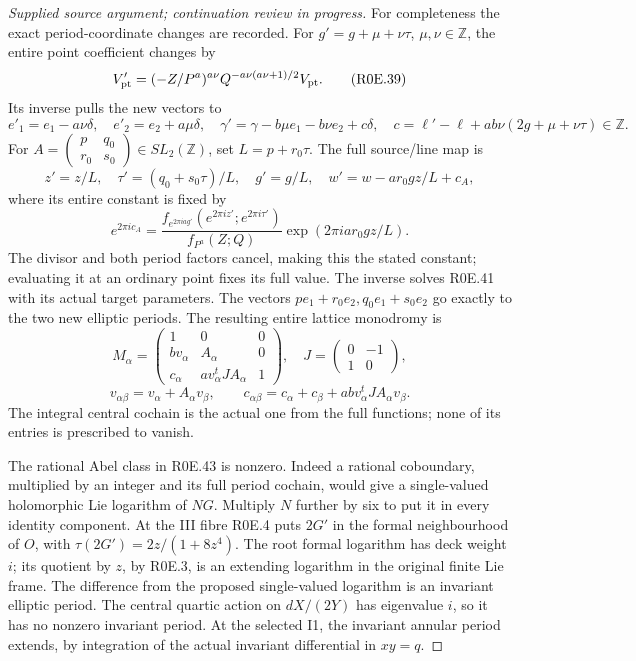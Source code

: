 \begin{proof}[Supplied source argument; continuation review in progress]
For completeness the exact period-coordinate changes are recorded.
For \(g'=g+\mu+\nu\tau\), \(\mu,\nu\in\mathbb Z\), the entire
point coefficient changes by
\[
 V'_{\rm pt}=(-Z/P^a)^{a\nu}
              Q^{-a\nu(a\nu+1)/2}V_{\rm pt}.
 \tag{R0E.39}
\]
Its inverse pulls the new vectors to
\[
 e'_1=e_1-a\nu\delta,\quad e'_2=e_2+a\mu\delta,\quad
 \gamma'=\gamma-b\mu e_1-b\nu e_2+c\delta,\quad
 c=\ell'-\ell+ab\nu(2g+\mu+\nu\tau)\in\mathbb Z.
 \tag{R0E.40}
\]
For \(A=\left(\begin{smallmatrix}p&q_0\\r_0&s_0\end{smallmatrix}\right)
\in SL_2(\mathbb Z)\), set \(L=p+r_0\tau\). The full source/line map is
\[
 z'=z/L,\quad \tau'=(q_0+s_0\tau)/L,\quad g'=g/L,
 \quad w'=w-a r_0gz/L+c_A,
 \tag{R0E.41}
\]
where its entire constant is fixed by
\[
 e^{2\pi i c_A}=
 \frac{f_{e^{2\pi iag'}}(e^{2\pi iz'};e^{2\pi i\tau'})}
 {f_{P^a}(Z;Q)}\exp(2\pi i a r_0gz/L).
 \tag{R0E.42}
\]
The divisor and both period factors cancel, making this the stated
constant; evaluating it at an ordinary point fixes its full value.
The inverse solves R0E.41 with its actual target parameters. The
vectors \(p e_1+r_0e_2,q_0e_1+s_0e_2\) go exactly to the two new
elliptic periods. The resulting entire lattice monodromy is
\[
 M_\alpha=\begin{pmatrix}
 1&0&0\\ b v_\alpha&A_\alpha&0\\
 c_\alpha&a v_\alpha^t J A_\alpha&1
 \end{pmatrix},\quad J=\begin{pmatrix}0&-1\\1&0\end{pmatrix},
 \tag{R0E.43}
\]
\[
 v_{\alpha\beta}=v_\alpha+A_\alpha v_\beta,\qquad
 c_{\alpha\beta}=c_\alpha+c_\beta+
                  ab v_\alpha^tJA_\alpha v_\beta.
 \tag{R0E.44}
\]
The integral central cochain is the actual one from the full functions;
none of its entries is prescribed to vanish.

The rational Abel class in R0E.43 is nonzero. Indeed a rational
coboundary, multiplied by an integer and its full period cochain,
would give a single-valued holomorphic Lie logarithm of \(NG\).
Multiply \(N\) further by six to put it in every identity component.
At the III fibre R0E.4 puts \(2G'\) in the formal neighbourhood of
\(O\), with \(\tau(2G')=2z/(1+8z^4)\). The root formal logarithm
has deck weight \(i\); its quotient by \(z\), by R0E.3, is an
extending logarithm in the original finite Lie frame. The difference
from the proposed single-valued logarithm is an invariant elliptic
period. The central quartic action on \(dX/(2Y)\) has eigenvalue
\(i\), so it has no nonzero invariant period. At the selected I1,
the invariant annular period extends, by integration of the actual
invariant differential in \(xy=q\).


\end{proof}
